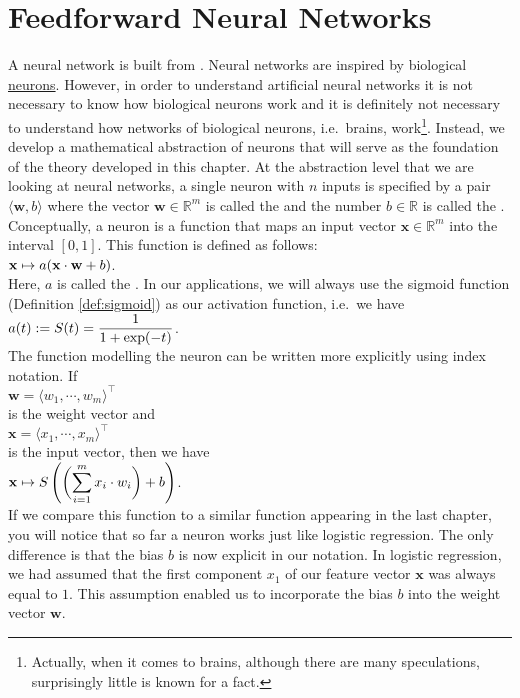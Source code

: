 \section{Feedforward Neural Networks}
A neural network is built from .  Neural networks are inspired by biological 
\href{https://en.wikipedia.org/wiki/Neuron}{neurons}.  However, in order to understand artificial neural
networks it is not necessary to know how biological neurons work and it is definitely not necessary to
understand how networks of biological neurons, i.e.~brains, work\footnote{
  Actually, when it comes to brains, although there are many speculations, surprisingly little is known for a fact.  
}.  
Instead, we develop a mathematical
abstraction of neurons that will serve as the foundation of the theory developed in this chapter.
At the abstraction level that we are looking at neural networks, a single neuron with $n$ inputs is specified by
a pair $\langle \mathbf{w}, b\rangle$ where the 
vector $\mathbf{w} \in \mathbb{R}^m$ is called the  and the number $b \in \mathbb{R}$ is called the .  
Conceptually, a neuron is a function that maps an input vector $\mathbf{x} \in \mathbb{R}^m$ into the interval
$[0,1]$.  This function is defined as follows: 
\\[0.2cm]
\hspace*{1.3cm}
$\displaystyle \mathbf{x} \mapsto a(\mathbf{x} \cdot \mathbf{w} + b)$.
\\[0.2cm]
Here, $a$ is called the .  In our applications, we will always use the sigmoid
function (Definition \ref{def:sigmoid}) as our activation function, i.e.~we have
\\[0.2cm]
\hspace*{1.3cm}
$\displaystyle a(t) := S(t) = \frac{1}{1 + \exp(-t)}$.
\\[0.2cm]
The function modelling the neuron can be written more explicitly using index notation.  If
\\[0.2cm]
\hspace*{1.3cm}
$\mathbf{w} = \langle w_1, \cdots, w_m \rangle^\top$ 
\\[0.2cm]
is the weight vector and 
\\[0.2cm]
\hspace*{1.3cm}
$\mathbf{x} = \langle x_1, \cdots, x_m \rangle^\top$
\\[0.2cm]
is the input vector, then we have
\\[0.2cm]
\hspace*{1.3cm}
$\displaystyle \mathbf{x} \mapsto S\left(\biggl(\sum\limits_{i=1}^m x_i \cdot w_i\biggr) + b\right)$.
\\[0.2cm]
If we compare this function to a similar function appearing in the last chapter, you will notice 
that so far a neuron works just like logistic regression.  The only difference is that the bias $b$
is now explicit in our notation.  In logistic regression, we had assumed that the first component $x_1$ of our
feature vector $\mathbf{x}$ was always equal to $1$.  This assumption enabled us to incorporate the bias $b$ into the
weight vector $\mathbf{w}$.

